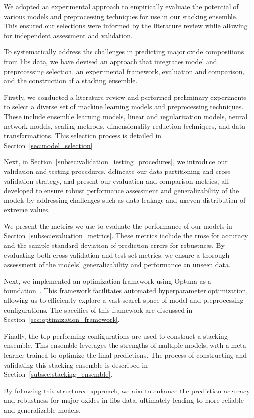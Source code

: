 We adopted an experimental approach to empirically evaluate the potential of various models and preprocessing techniques for use in our stacking ensemble.
This ensured our selections were informed by the literature review while allowing for independent assessment and validation.

To systematically address the challenges in predicting major oxide compositions from \gls{libs} data, we have devised an approach that integrates model and preprocessing selection, an experimental framework, evaluation and comparison, and the construction of a stacking ensemble.

Firstly, we conducted a literature review and performed preliminary experiments to select a diverse set of machine learning models and preprocessing techniques.
These include ensemble learning models, linear and regularization models, neural network models, scaling methods, dimensionality reduction techniques, and data transformations.
This selection process is detailed in Section~\ref{sec:model_selection}.

Next, in Section~\ref{subsec:validation_testing_procedures}, we introduce our validation and testing procedures, delineate our data partitioning and cross-validation strategy, and present our evaluation and comparison metrics, all developed to ensure robust performance assessment and generalizability of the models by addressing challenges such as data leakage and uneven distribution of extreme values.

We present the metrics we use to evaluate the performance of our models in Section~\ref{subsec:evaluation_metrics}.
These metrics include the \gls{rmse} for accuracy and the sample standard deviation of prediction errors for robustness.
By evaluating both cross-validation and test set metrics, we ensure a thorough assessment of the models' generalizability and performance on unseen data.

Next, we implemented an optimization framework using Optuna as a foundation~\cite{optuna_2019}.
This framework facilitates automated hyperparameter optimization, allowing us to efficiently explore a vast search space of model and preprocessing configurations.
The specifics of this framework are discussed in Section~\ref{sec:optimization_framework}.

Finally, the top-performing configurations are used to construct a stacking ensemble.
This ensemble leverages the strengths of multiple models, with a meta-learner trained to optimize the final predictions.
The process of constructing and validating this stacking ensemble is described in Section~\ref{subsec:stacking_ensemble}.

By following this structured approach, we aim to enhance the prediction accuracy and robustness for major oxides in \gls{libs} data, ultimately leading to more reliable and generalizable models.




